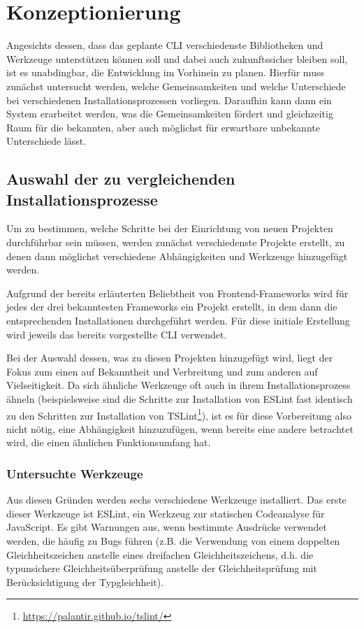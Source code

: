 \section{Konzeptionierung}
\label{komzeptionierung}
Angesichts dessen, dass das geplante \gls{CLI} verschiedenste Bibliotheken und Werkzeuge unterstützen können soll und dabei auch zukunftssicher bleiben soll, ist es unabdingbar, die Entwicklung im Vorhinein zu planen. Hierfür muss zunächst untersucht werden, welche Gemeinsamkeiten und welche Unterschiede bei verschiedenen Installationsprozessen vorliegen. Daraufhin kann dann ein System erarbeitet werden, was die Gemeinsamkeiten fördert und gleichzeitig Raum für die bekannten, aber auch möglichst für erwartbare unbekannte Unterschiede lässt.

\subsection{Auswahl der zu vergleichenden Installationsprozesse}
Um zu bestimmen, welche Schritte bei der Einrichtung von neuen Projekten durchführbar sein müssen, werden zunächst verschiedenste Projekte erstellt, zu denen dann möglichst verschiedene Abhängigkeiten und Werkzeuge hinzugefügt werden.

Aufgrund der bereits erläuterten Beliebtheit von Frontend-Frameworks wird für jedes der drei bekanntesten Frameworks ein Projekt erstellt, in dem dann die entsprechenden Installationen durchgeführt werden. Für diese initiale Erstellung wird jeweils das bereits vorgestellte \gls{CLI} verwendet.

Bei der Auswahl dessen, was zu diesen Projekten hinzugefügt wird, liegt der Fokus zum einen auf Bekanntheit und Verbreitung und zum anderen auf Vielseitigkeit. Da sich ähnliche Werkzeuge oft auch in ihrem Installationsprozess ähneln (beispielsweise sind die Schritte zur Installation von ESLint fast identisch zu den Schritten zur Installation von TSLint\footnote{\url{https://palantir.github.io/tslint/}}), ist es für diese Vorbereitung also nicht nötig, eine Abhängigkeit hinzuzufügen, wenn bereits eine andere betrachtet wird, die einen ähnlichen Funktionsumfang hat.

\subsubsection{Untersuchte Werkzeuge}
Aus diesen Gründen werden sechs verschiedene Werkzeuge installiert. Das erste dieser Werkzeuge ist ESLint, ein Werkzeug zur statischen Codeanalyse für JavaScript. Es gibt Warnungen aus, wenn bestimmte Ausdrücke verwendet werden, die häufig zu Bugs führen (z.B. die Verwendung von einem doppelten Gleichheitszeichen anstelle eines dreifachen Gleichheitszeichens, d.h. die typunsichere Gleichheitsüberprüfung anstelle der Gleichheitsprüfung mit Berücksichtigung der Typgleichheit).

